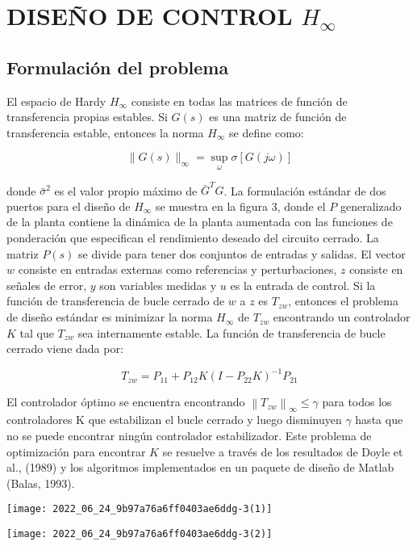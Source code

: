 \section{DISEÑO DE CONTROL $H_{\infty}$}
\subsection{Formulación del problema}
El espacio de Hardy $H_{\infty}$ consiste en todas las matrices de función de transferencia propias estables. Si $G(s)$ es una matriz de función de transferencia estable, entonces la norma $H_{\infty}$ se define como:

$$
\| G(s)\|_{\infty}=\sup _{\omega} \sigma[G(j \omega)]
$$

donde $\bar{\sigma}^{2}$ es el valor propio máximo de $\bar{G}^{T} G$. La formulación estándar de dos puertos para el diseño de $H_{\infty}$ se muestra en la figura 3, donde el $P$ generalizado de la planta contiene la dinámica de la planta aumentada con las funciones de ponderación que especifican el rendimiento deseado del circuito cerrado. La matriz $P(s)$ se divide para tener dos conjuntos de entradas y salidas. El vector $w$ consiste en entradas externas como referencias y perturbaciones, $z$ consiste en señales de error, $y$ son variables medidas y $u$ es la entrada de control. Si la función de transferencia de bucle cerrado de $w$ a $z$ es $T_{z w}$, entonces el problema de diseño estándar es minimizar la norma $H_{\infty}$ de $T_{z w}$ encontrando un controlador $K$ tal que $T_{z w}$ sea internamente estable. La función de transferencia de bucle cerrado viene dada por:

$$
T_{z w}=P_{11}+P_{12} K\left(I-P_{22} K\right)^{-1} P_{21}
$$

El controlador óptimo se encuentra encontrando $\left\| T_{z w}\right\|_{\infty} \leq \gamma$ para todos los controladores $\mathrm{K}$ que estabilizan el bucle cerrado y luego disminuyen $\gamma$ hasta que no se puede encontrar ningún controlador estabilizador. Este problema de optimización para encontrar $K$ se resuelve a través de los resultados de Doyle et al., (1989) y los algoritmos implementados en un paquete de diseño de Matlab (Balas, 1993).

\begin{center}
\texttt{[image: 2022\_06\_24\_9b97a76a6ff0403ae6ddg-3(1)]}
\end{center}

\begin{center}
\texttt{[image: 2022\_06\_24\_9b97a76a6ff0403ae6ddg-3(2)]}
\end{center}

